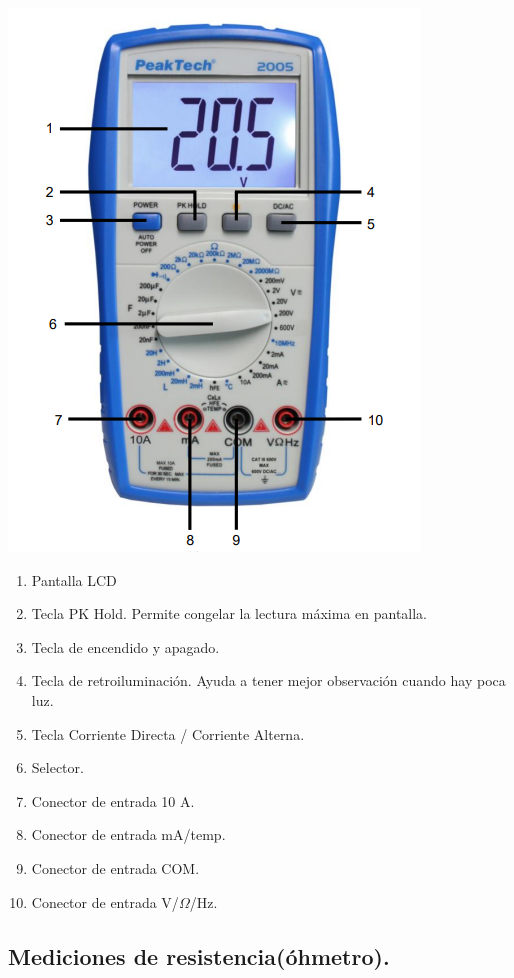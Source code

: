 \documentclass[10pt]{article}
\begin{document}
\begin{multicols}{2}
\begin{center}
	\includegraphics[scale = 0.5]{Imagenes/Marco/Multimetro.PNG}\\
	\begin{enumerate}
		\item Pantalla LCD
		\item Tecla PK Hold. Permite congelar la lectura máxima en pantalla.
		\item Tecla de encendido y apagado. 
		\item Tecla de retroiluminación. Ayuda a tener mejor observación cuando hay poca luz.
		\item Tecla Corriente Directa / Corriente Alterna.
		\item Selector.
		\item Conector de entrada 10 A.
		\item Conector de entrada mA/temp.
		\item Conector de entrada COM.
		\item Conector de entrada V/$\Omega$/Hz.
	\end{enumerate}
\end{center}


\subsection{Mediciones de resistencia(óhmetro).}


\end{multicols}
\end{document}
